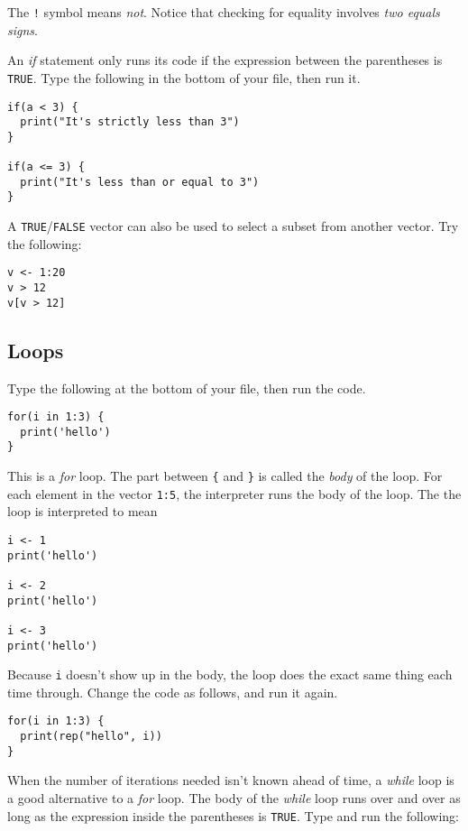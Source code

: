 \documentclass[]{book}
\theoremstyle{definition}
\theoremstyle{definition}
\theoremstyle{definition}
\theoremstyle{remark}
\begin{document}
The \texttt{!} symbol means \emph{not}. Notice that checking for
equality involves \emph{two equals signs}.

An \emph{if} statement only runs its code if the expression between the
parentheses is \texttt{TRUE}. Type the following in the bottom of your
file, then run it.

\begin{verbatim}
if(a < 3) {
  print("It's strictly less than 3")
}

if(a <= 3) {
  print("It's less than or equal to 3")
}
\end{verbatim}

A \texttt{TRUE}/\texttt{FALSE} vector can also be used to select a
subset from another vector. Try the following:

\begin{verbatim}
v <- 1:20
v > 12
v[v > 12]
\end{verbatim}

\hypertarget{loops}{%
\subsection{Loops}\label{loops}}

Type the following at the bottom of your file, then run the code.

\begin{verbatim}
for(i in 1:3) {
  print('hello')
}
\end{verbatim}

This is a \emph{for} loop. The part between \texttt{\{} and \texttt{\}}
is called the \emph{body} of the loop. For each element in the vector
\texttt{1:5}, the interpreter runs the body of the loop. The the loop is
interpreted to mean

\begin{verbatim}
i <- 1
print('hello')

i <- 2
print('hello')

i <- 3
print('hello')
\end{verbatim}

Because \texttt{i} doesn't show up in the body, the loop does the exact
same thing each time through. Change the code as follows, and run it
again.

\begin{verbatim}
for(i in 1:3) {
  print(rep("hello", i))
}
\end{verbatim}

When the number of iterations needed isn't known ahead of time, a
\emph{while} loop is a good alternative to a \emph{for} loop. The body
of the \emph{while} loop runs over and over as long as the expression
inside the parentheses is \texttt{TRUE}. Type and run the following:
\end{document}
